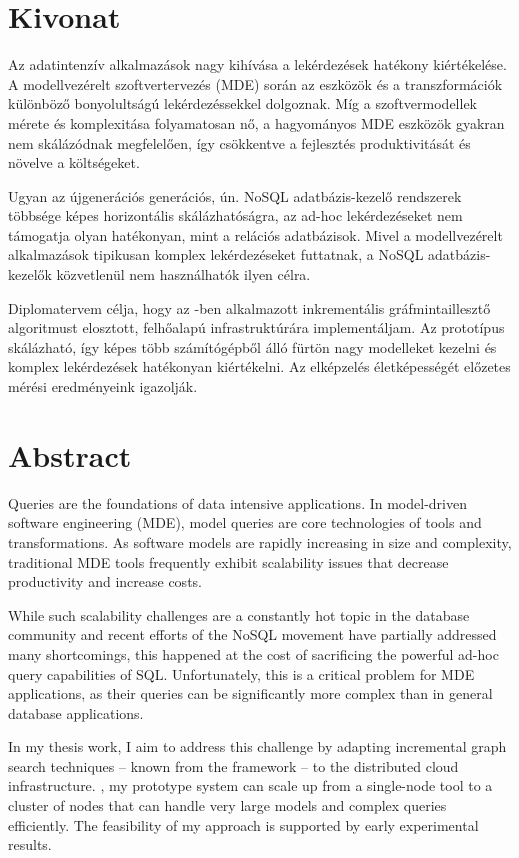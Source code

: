 \chapter*{Kivonat}

Az adatintenzív alkalmazások nagy kihívása a lekérdezések hatékony kiértékelése. A modellvezérelt szoftvertervezés (MDE) során az eszközök és a transzformációk különböző bonyolultságú lekérdezéssekkel dolgoznak. Míg a szoftvermodellek mérete és komplexitása folyamatosan nő, a hagyományos MDE eszközök gyakran nem skálázódnak megfelelően, így csökkentve a fejlesztés produktivitását és növelve a költségeket.

Ugyan az újgenerációs generációs, ún. NoSQL adatbázis-kezelő rendszerek többsége képes horizontális skálázhatóságra, az ad-hoc lekérdezéseket nem támogatja olyan hatékonyan, mint a relációs adatbázisok. Mivel a modellvezérelt alkalmazások tipikusan komplex lekérdezéseket futtatnak, a NoSQL adatbázis-kezelők közvetlenül nem használhatók ilyen célra.

Diplomatervem célja, hogy az \eiq{}-ben alkalmazott inkrementális gráfmintaillesztő algoritmust elosztott, felhőalapú infrastruktúrára implementáljam. Az \iqd{} prototípus skálázható, így képes több számítógépből álló fürtön nagy modelleket kezelni és komplex lekérdezések hatékonyan kiértékelni. Az elképzelés életképességét előzetes mérési eredményeink igazolják.

\vfill

\chapter*{Abstract}

Queries are the foundations of data intensive applications. In model-driven software engineering (MDE), model queries are core technologies of tools and transformations. As software models are rapidly increasing in size and complexity, traditional MDE tools frequently exhibit scalability issues that decrease productivity and increase costs.

While such scalability challenges are a constantly hot topic in the database community and recent efforts of the NoSQL movement have partially addressed many shortcomings, this happened at the cost of sacrificing the powerful ad-hoc query capabilities of SQL. Unfortunately, this is a critical problem for MDE applications, as their queries can be significantly more complex than in general database applications.

In my thesis work, I aim to address this challenge by adapting incremental graph search techniques -- known from the \eiq{} framework -- to the distributed cloud infrastructure. \iqd, my prototype system can scale up from a single-node tool to a cluster of nodes that can handle very large models and complex queries efficiently. The feasibility of my approach is supported by early experimental results.

\vfill
